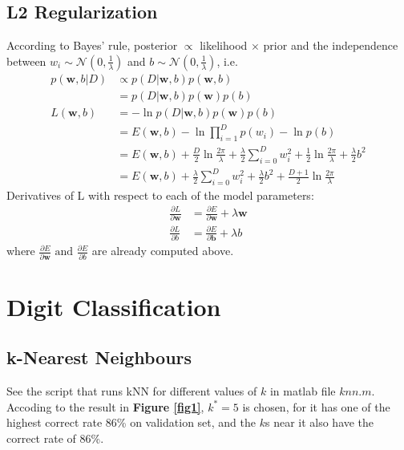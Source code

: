 \documentclass{article}
\begin{document}
\subsection{L2 Regularization}
According to Bayes’ rule, posterior $\propto$ likelihood $\times$ prior and the independence between $w_i\sim\mathcal{N}(0,\frac{1}{\lambda})$ and $b\sim\mathcal{N}(0,\frac{1}{\lambda})$, i.e.
  \[
  \begin{aligned}
  p(\bm{w},b|D)&\propto{p(D|\bm{w},b)p(\bm{w},b)}\\
  &=p(D|\bm{w},b)p(\bm{w})p(b)\\
  L(\bm{w},b)&=-\ln{p(D|\bm{w},b)p(\bm{w})p(b)}\\
  &=E(\bm{w},b)-\ln\prod_{i=1}^{D}{p(w_i)}-\ln{p(b)}\\
  &=E(\bm{w},b)+\frac{D}{2}\ln{\frac{2\pi}{\lambda}}+\frac{\lambda}{2}\sum_{i=0}^{D}w_i^2+\frac{1}{2}\ln{\frac{2\pi}{\lambda}}+\frac{\lambda}{2}b^2\\
  &=E(\bm{w},b)+\frac{\lambda}{2}\sum_{i=0}^{D}w_i^2+\frac{\lambda}{2}b^2+\frac{D+1}{2}\ln{\frac{2\pi}{\lambda}}
  \end{aligned}
  \]
Derivatives of L with respect to each of the model parameters:
  \[
  \begin{aligned}
  \frac{\partial{L}}{\partial\bm{w}}&=\frac{\partial{E}}{\partial\bm{w}}+\lambda\bm{w}\\
  \frac{\partial{L}}{\partial{b}}&=\frac{\partial{E}}{\partial\bm{b}}+\lambda{b}
  \end{aligned}
  \]
where $\frac{\partial{E}}{\partial\bm{w}}\text{ and }\frac{\partial{E}}{\partial{b}}$ are already computed above.

\section{Digit Classification}

\subsection{k-Nearest Neighbours}
See the script that runs kNN for different values of $k$ in matlab file $knn.m$. Accoding to the result in \textbf{Figure \ref{fig1}}, $k^*=5$ is chosen, for it has one of the highest correct rate 86\% on validation set, and the $k$s near it also have the correct rate of 86\%.
\end{document}
